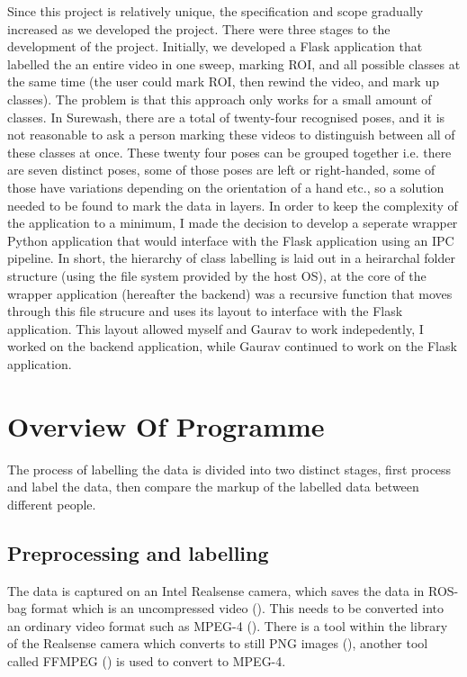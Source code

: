Since this project is relatively unique, the specification and scope gradually increased as we developed the project. There were three stages to the development of the project. Initially, we developed a Flask application that labelled the an entire video in one sweep, marking ROI, and all possible classes at the same time (the user could mark ROI, then rewind the video, and mark up classes). The problem is that this approach only works for a small amount of classes. In Surewash, there are a total of twenty-four recognised poses, and it is not reasonable to ask a person marking these videos to distinguish between all of these classes at once. These twenty four poses can be grouped together i.e. there are seven distinct poses, some of those poses are left or right-handed, some of those have variations depending on the orientation of a hand etc., so a solution needed to be found to mark the data in layers. In order to keep the complexity of the application to a minimum, I made the decision to develop a seperate wrapper Python application that would interface with the Flask application using an IPC pipeline. In short, the hierarchy of class labelling is laid out in a heirarchal folder structure (using the file system provided by the host OS), at the core of the wrapper application (hereafter the backend) was a recursive function that moves through this file strucure and uses its layout to interface with the Flask application. This layout allowed myself and Gaurav to work indepedently, I worked on the backend application, while Gaurav continued to work on the Flask application.

\section{Overview Of Programme}
The process of labelling the data is divided into two distinct stages, first process and label the data, then compare the markup of the labelled data between different people.
    \subsection{Preprocessing and labelling}
    The data is captured on an Intel Realsense camera, which saves the data in ROS-bag format which is an uncompressed video (\cite{intelrosbag}). This needs to be converted into an ordinary video format such as MPEG-4 (\cite{wiegand2003overview}). There is a tool within the library of the Realsense camera which converts to still PNG images (\cite{boutell1997rfc}), another tool called FFMPEG (\cite{ffmpeg}) is used to convert to MPEG-4. 
    
